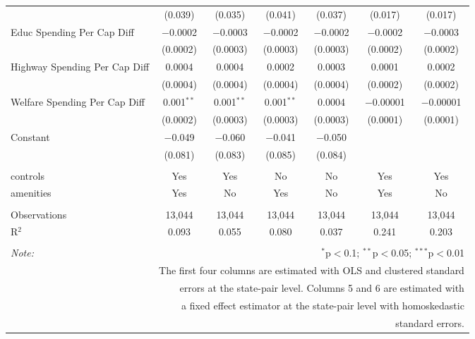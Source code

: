 \begin{table}[!htbp]
\begin{tabular}{@{\extracolsep{5pt}}lcccccc}
  & (0.039) & (0.035) & (0.041) & (0.037) & (0.017) & (0.017) \\ 
  Educ Spending Per Cap Diff & $-$0.0002 & $-$0.0003 & $-$0.0002 & $-$0.0002 & $-$0.0002 & $-$0.0003 \\ 
  & (0.0002) & (0.0003) & (0.0003) & (0.0003) & (0.0002) & (0.0002) \\ 
  Highway Spending Per Cap Diff & 0.0004 & 0.0004 & 0.0002 & 0.0003 & 0.0001 & 0.0002 \\ 
  & (0.0004) & (0.0004) & (0.0004) & (0.0004) & (0.0002) & (0.0002) \\ 
  Welfare Spending Per Cap Diff & 0.001$^{**}$ & 0.001$^{**}$ & 0.001$^{**}$ & 0.0004 & $-$0.00001 & $-$0.00001 \\ 
  & (0.0002) & (0.0003) & (0.0003) & (0.0003) & (0.0001) & (0.0001) \\ 
  Constant & $-$0.049 & $-$0.060 & $-$0.041 & $-$0.050 &  &  \\ 
  & (0.081) & (0.083) & (0.085) & (0.084) &  &  \\ 
 \hline \\[-1.8ex] 
controls & Yes & Yes & No & No & Yes & Yes \\ 
amenities & Yes & No & Yes & No & Yes & No \\ 
\hline \\[-1.8ex] 
Observations & 13,044 & 13,044 & 13,044 & 13,044 & 13,044 & 13,044 \\ 
R$^{2}$ & 0.093 & 0.055 & 0.080 & 0.037 & 0.241 & 0.203 \\ 
\hline 
\hline \\[-1.8ex] 
\textit{Note:}  & \multicolumn{6}{r}{$^{*}$p$<$0.1; $^{**}$p$<$0.05; $^{***}$p$<$0.01} \\ 
 & \multicolumn{6}{r}{The first four columns are estimated with OLS and clustered standard} \\ 
 & \multicolumn{6}{r}{ errors at the state-pair level. Columns 5 and 6 are estimated with} \\ 
 & \multicolumn{6}{r}{a fixed effect estimator at the state-pair level with homoskedastic} \\ 
 & \multicolumn{6}{r}{standard errors.} \\ 
\end{tabular} 
\end{table} 
